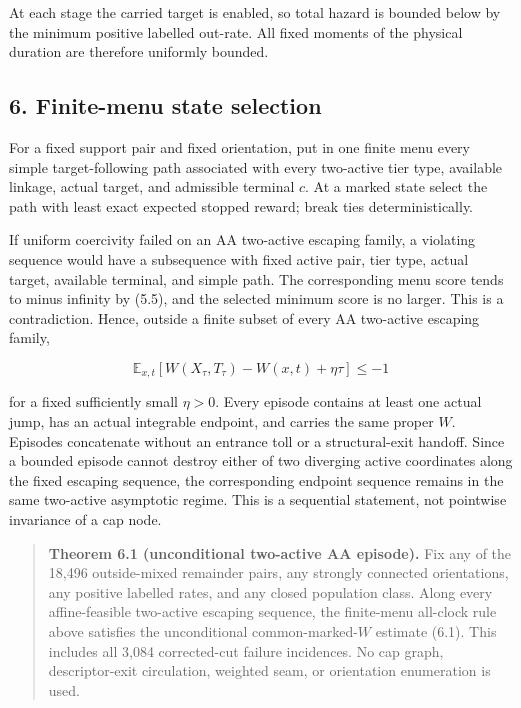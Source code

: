 At each stage the carried target is enabled, so total hazard is bounded
below by the minimum positive labelled out-rate. All fixed moments of
the physical duration are therefore uniformly bounded.

\subsection{6. Finite-menu state
selection}

For a fixed support pair and fixed orientation, put in one finite menu
every simple target-following path associated with every two-active tier
type, available linkage, actual target, and admissible terminal \(c\).
At a marked state select the path with least exact expected stopped
reward; break ties deterministically.

If uniform coercivity failed on an AA two-active escaping family, a
violating sequence would have a subsequence with fixed active pair, tier
type, actual target, available terminal, and simple path. The
corresponding menu score tends to minus infinity by (5.5), and the
selected minimum score is no larger. This is a contradiction. Hence,
outside a finite subset of every AA two-active escaping family,

\[
 \mathbb E_{x,t}
   [W(X_\tau,T_\tau)-W(x,t)+\eta\tau]\le-1           \tag{6.1}
\]

for a fixed sufficiently small \(\eta>0\). Every episode contains at
least one actual jump, has an actual integrable endpoint, and carries
the same proper \(W\). Episodes concatenate without an entrance toll or
a structural-exit handoff. Since a bounded episode cannot destroy either
of two diverging active coordinates along the fixed escaping sequence,
the corresponding endpoint sequence remains in the same two-active
asymptotic regime. This is a sequential statement, not pointwise
invariance of a cap node.

\begin{quote}
\textbf{Theorem 6.1 (unconditional two-active AA episode).} Fix any of
the 18,496 outside-mixed remainder pairs, any strongly connected
orientations, any positive labelled rates, and any closed population
class. Along every affine-feasible two-active escaping sequence, the
finite-menu all-clock rule above satisfies the unconditional
common-marked-\(W\) estimate (6.1). This includes all 3,084
corrected-cut failure incidences. No cap graph, descriptor-exit
circulation, weighted seam, or orientation enumeration is used.
\end{quote}

